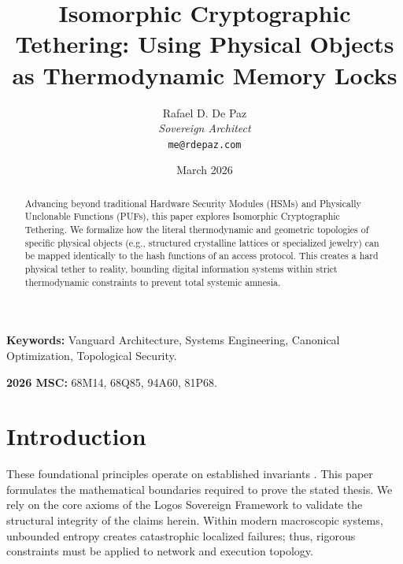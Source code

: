\documentclass[12pt, a4paper]{article}
\theoremstyle{plain}
\theoremstyle{definition}
\theoremstyle{remark}
\begin{document}
\title{
  \textbf{Isomorphic Cryptographic Tethering: Using Physical Objects as Thermodynamic Memory Locks}
}
\author{
  Rafael D. De Paz \\
  \textit{Sovereign Architect} \\
  \texttt{me@rdepaz.com}
}
\date{March 2026}
\maketitle

\begin{abstract}
Advancing beyond traditional Hardware Security Modules (HSMs) and Physically Unclonable Functions (PUFs), this paper explores Isomorphic Cryptographic Tethering. We formalize how the literal thermodynamic and geometric topologies of specific physical objects (e.g., structured crystalline lattices or specialized jewelry) can be mapped identically to the hash functions of an access protocol. This creates a hard physical tether to reality, bounding digital information systems within strict thermodynamic constraints to prevent total systemic amnesia.
\end{abstract}

\vspace{1em}
\noindent\textbf{Keywords:} Vanguard Architecture, Systems Engineering, Canonical Optimization, Topological Security.

\vspace{0.5em}
\noindent\textbf{2026 MSC:} 68M14, 68Q85, 94A60, 81P68.

\section{Introduction}
These foundational principles operate on established invariants \cite{suh2007physical,pappu2002physical}.\label{sec:intro}
This paper formulates the mathematical boundaries required to prove the stated thesis. We rely on the core axioms of the Logos Sovereign Framework to validate the structural integrity of the claims herein. Within modern macroscopic systems, unbounded entropy creates catastrophic localized failures; thus, rigorous constraints must be applied to network and execution topology.
\end{document}

